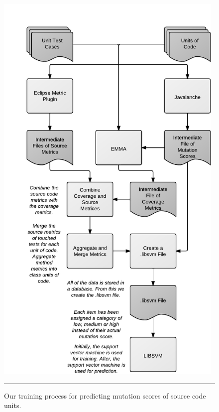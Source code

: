 \begin{figure}[!tb]
  \centering
  \includegraphics[width=11cm]{figures/process.pdf}
  \caption{Our training process for predicting mutation scores of source code units.}
  \label{fig:process}
  \vspace{2mm}
  \hrule
\end{figure}



